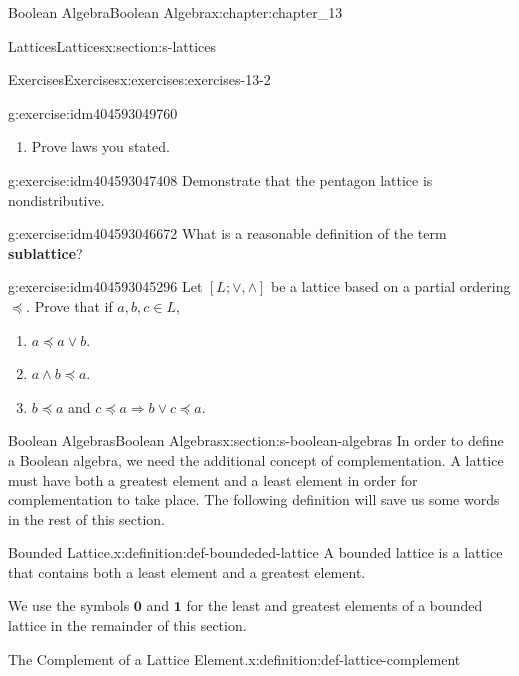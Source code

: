 \documentclass[twoside,10pt,]{book}
\newcommand{\terminology}[1]{\textbf{#1}}
\numberwithin{equation}{section}
\begin{document}
\begin{chapterptx}{Boolean Algebra}{}{Boolean Algebra}{}{}{x:chapter:chapter_13}
\begin{sectionptx}{Lattices}{}{Lattices}{}{}{x:section:s-lattices}
\begin{exercises-subsection}{Exercises}{}{Exercises}{}{}{x:exercises:exercises-13-2}
\begin{divisionexercise}{3}{}{}{g:exercise:idm404593049760}
\begin{enumerate}[label=(\alph*)]
\item{}Prove laws you stated.%
\end{enumerate}
%
\end{divisionexercise}%
\begin{divisionexercise}{4}{}{}{g:exercise:idm404593047408}%
Demonstrate that the pentagon lattice is nondistributive.%
\end{divisionexercise}%
\begin{divisionexercise}{5}{}{}{g:exercise:idm404593046672}%
What is a reasonable definition of the term \terminology{sublattice}?%
\end{divisionexercise}%
\begin{divisionexercise}{6}{}{}{g:exercise:idm404593045296}%
Let \([L; \lor  , \land ]\) be a lattice based on a partial ordering \(\preceq\).   Prove that if \(a, b, c \in L\),%
\begin{enumerate}[label=(\alph*)]
\item{}\(a \preceq a \lor  b \).%
\item{}\(a \land  b \preceq  a\).%
\item{}\(b \preceq  a\) and \(c \preceq  a \Rightarrow   b \lor  c \preceq a\).%
\end{enumerate}
%
\end{divisionexercise}%
\end{exercises-subsection}
\end{sectionptx}
%
%
\typeout{************************************************}
\typeout{************************************************}
%
\begin{sectionptx}{Boolean Algebras}{}{Boolean Algebras}{}{}{x:section:s-boolean-algebras}
%
In order to define a Boolean algebra, we need the additional concept of complementation. A lattice must have both a greatest element and a least element in order for complementation to take place.  The following definition will save us some words in the rest of this section.%
\begin{definition}{Bounded Lattice.}{x:definition:def-boundeded-lattice}%
%
A bounded lattice is a lattice that contains both a least element and a greatest element.%
\end{definition}
We use the symbols \(\pmb{0}\) and  \(\pmb{1}\) for the least and greatest elements of a bounded lattice in the remainder of this section.%
\begin{definition}{The Complement of a Lattice Element.}{x:definition:def-lattice-complement}%

\end{definition}
\end{sectionptx}
\end{chapterptx}
\end{document}
